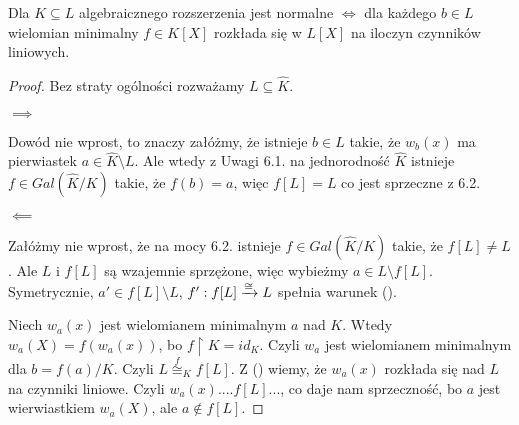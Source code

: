 \begin{tw}
Dla $K\subseteq L$ algebraicznego rozszerzenia jest normalne $\iff$ dla każdego $b\in L$ wielomian minimalny $f\in K[X]$ rozkłada się w $L[X]$ na iloczyn czynników liniowych.
\end{tw}
\begin{proof}
Bez straty ogólności rozważamy $L\subseteq\hat{K}$. 

$\implies$ 

Dowód nie wprost, to znaczy załóżmy, że istnieje $b\in L$ takie, że $w_b(x)$ ma pierwiastek $a\in \hat{K}\setminus L$. Ale wtedy z Uwagi 6.1. na jednorodność $\hat{K}$ istnieje $f\in Gal(\hat{K}/K)$ takie, że $f(b)=a$, więc $f[L]=L$ co jest sprzeczne z 6.2.

$\impliedby$

Załóżmy nie wprost, że na mocy 6.2. istnieje $f\in Gal(\hat{K}/K)$ takie, że $f[L]\neq L$. Ale $L$ i $f[L]$ są wzajemnie sprzężone, więc wybieżmy $a\in L\setminus f[L]$. Symetrycznie, $a'\in f[L]\setminus L$, $f':f[L]\xrightarrow[]{\cong}L$ spełnia warunek (\kawa).

Niech $w_a(x)$ jest wielomianem minimalnym $a$ nad $K$. Wtedy $w_a(X)=f(w_a(x))$, bo $f\restriction K=id_K$. Czyli $w_a$ jest wielomianem minimalnym dla $b=f(a)/K$. Czyli $L\overset{f}{\cong}_Kf[L]$. Z (\kawa) wiemy, że $w_a(x)$ rozkłada się nad $L$ na czynniki liniowe. Czyli $w_a(x)....f[L]...$, co daje nam sprzeczność, bo $a$ jest wierwiastkiem $w_a(X)$, ale $a\notin f[L]$.

\end{proof}




































